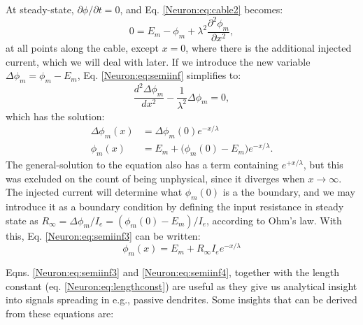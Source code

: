 At steady-state, $\partial \phi/\partial t = 0$, and Eq. \ref{Neuron:eq:cable2} becomes:
\begin{equation}
0 = E_m-\phi_m +  \lambda^2 \frac{\partial^2 \phi_m}{\partial x^2}, 
\label{Neuron:eq:semiinf}
\end{equation}
at all points along the cable, except $x=0$, where there is the additional injected current, which we will deal with later. If we introduce the new variable $\Delta{\phi_m}=\phi_m-E_m$, Eq. \ref{Neuron:eq:semiinf} simplifies to:
\begin{equation}
\frac{d^2 \Delta{\phi_m}}{d x^2} -  \frac{1}{\lambda^2} \Delta{\phi_m}=0, 
\label{Neuron:eq:semiinf2}
\end{equation}
which has the solution:
\begin{align}
\Delta{\phi_m}(x) &= \Delta{\phi_m}(0) e^{-x/\lambda} \\
\phi_m(x) &= E_m + \big( \phi_m(0)-E_m \big) e^{-x/\lambda}.
\label{Neuron:eq:semiinf3}
\end{align}
The general-solution to the equation also has a term containing $e^{+x/\lambda}$, but this was excluded on the count of being unphysical, since it diverges when $x \rightarrow \infty$. The injected current will determine what $\phi_m(0)$ is a the boundary, and we may introduce it as a boundary condition by defining the input resistance in steady state as $R_{\infty} =  \Delta \phi_m/I_e =  (\phi_m(0)-E_m)/I_e$, according to Ohm's law. With this, Eq. \ref{Neuron:eq:semiinf3} can be written:
\begin{equation}
\phi_m(x) = E_m + R_{\infty} I_e e^{-x/\lambda}
\label{Neuron:eq:semiinf4}
\end{equation}

Eqns. \ref{Neuron:eq:semiinf3} and \ref{Neuron:eq:semiinf4}, together with the length constant (eq. \ref{Neuron:eq:lengthconst}) are useful as they give us analytical insight into signals spreading in e.g., passive dendrites. Some insights that can be derived from these equations are:

